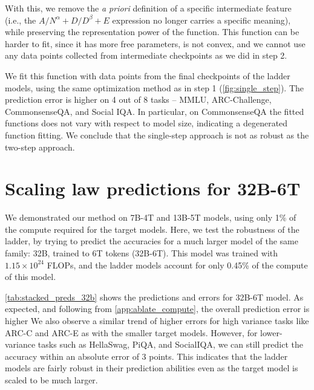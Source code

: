 With this, we remove the \textit{a priori} definition of a specific intermediate feature (i.e., the $A / N^\alpha + D / D^\beta + E$ expression no longer carries a specific meaning), while preserving the representation power of the function.
This function can be harder to fit, since it has more free parameters, is not convex, and we cannot use any data points collected from intermediate checkpoints as we did in step 2.

We fit this function with data points from the final checkpoints of the ladder models, using the same optimization method as in step 1 (\autoref{fig:single_step}). 
The prediction error is higher on 4 out of 8 tasks -- MMLU, ARC-Challenge, CommonsenseQA, and Social IQA.
In particular, on CommonsenseQA the fitted functions does not vary with respect to model size, indicating a degenerated function fitting.
We conclude that the single-step approach is not as robust as the two-step approach.



\section{Scaling law predictions for 32B-6T}
\label{app:32B-6T}

We demonstrated our method on 7B-4T and 13B-5T models, using only 1\% of the compute required for the target models. Here, we test the robustness of the ladder, by trying to predict the accuracies for a much larger model of the same family: \basemodelname{} 32B, trained to 6T tokens (32B-6T). This model was trained with $1.15 \times 10^{24}$ FLOPs, and the ladder models account for only 0.45\% of the compute of this model. 



\autoref{tab:stacked_preds_32b} shows the predictions and errors for 32B-6T model. As expected, and following from \ref{app:ablate_compute}, the overall prediction error is higher %
We also observe a similar trend of higher errors for high variance tasks like ARC-C and ARC-E as with the smaller target models.
However, for lower-variance tasks such as HellaSwag, PiQA, and SocialIQA, we can still predict the accuracy within an absolute error of 3 points.  This indicates that the ladder models are fairly robust in their prediction abilities even as the target model is scaled to be much larger.